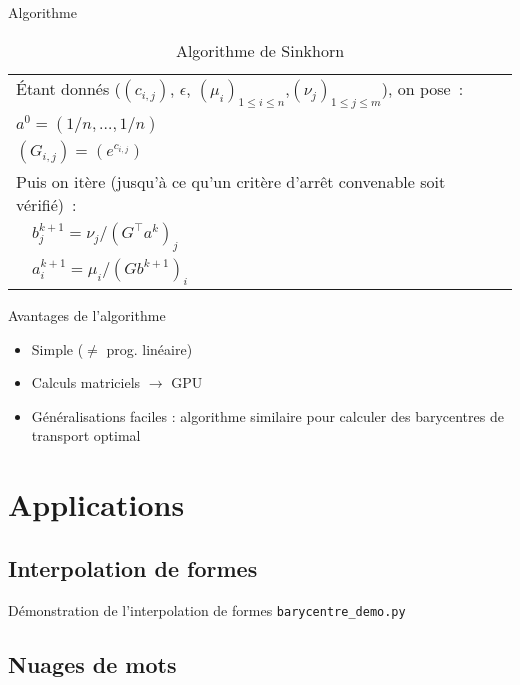 \documentclass{beamer}
\newcommand{\transpose}{\intercal}
\begin{document}
\begin{frame}{Algorithme}
\begin{table}[h!]
\centering
\caption*{Algorithme de Sinkhorn}
\label{algorithme}
\begin{tabular}{|l|}
\hline
\'Etant donnés ($(c_{i,j})$, $\epsilon$, $(\mu_i)_{1\le i \le n}$,$(\nu_j)_{1 \le j \le m}$), on pose~: \\
$a^0 = (1/n, \ldots, 1/n)$\\
$(G_{i,j}) = (e^{c_{i,j}})$\\
Puis on itère (jusqu'à ce qu'un critère d'arrêt convenable soit vérifié)~: \\
$\quad b^{k+1}_j = \nu_j / (G^\transpose a^k)_j$\\
$\quad a^{k+1}_i = \mu_i /(G b^{k+1})_i$ \\
\hline
\end{tabular}
\end{table}
\end{frame}

\begin{frame}{Avantages de l'algorithme}
\begin{itemize}
\item Simple ($\ne$ prog. linéaire)
\item Calculs matriciels $\rightarrow$ GPU
\item Généralisations faciles : algorithme similaire pour calculer des barycentres de transport optimal
\end{itemize}
\end{frame}

\section{Applications}

\subsection{Interpolation de formes}

\begin{frame}{Démonstration de l'interpolation de formes}
\texttt{barycentre\_demo.py}
\end{frame}

\subsection{Nuages de mots}
\end{document}
